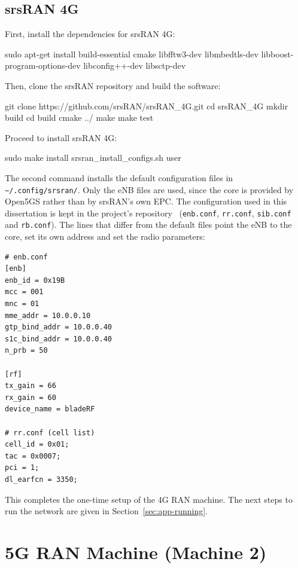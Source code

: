 \subsection{srsRAN 4G}
\label{sec:srsRAN_4G}
First, install the dependencies for srsRAN 4G:
\begin{code}
sudo apt-get install build-essential cmake libfftw3-dev libmbedtls-dev libboost-program-options-dev libconfig++-dev libsctp-dev
\end{code}
Then, clone the srsRAN repository and build the software:
\begin{code}
git clone https://github.com/srsRAN/srsRAN_4G.git
cd srsRAN_4G
mkdir build
cd build
cmake ../
make
make test
\end{code}
Proceed to install srsRAN 4G:
\begin{code}
sudo make install
srsran_install_configs.sh user
\end{code}

The second command installs the default configuration files in \texttt{\textasciitilde/.config/srsran/}. Only the \gls{eNB} files are used, since the core is provided by Open5GS rather than by srsRAN's own \gls{EPC}. The configuration used in this dissertation is kept in the project's repository~\cite{thesis_repo} (\texttt{enb.conf}, \texttt{rr.conf}, \texttt{sib.conf} and \texttt{rb.conf}). The lines that differ from the default files point the \gls{eNB} to the core, set its own address and set the radio parameters:
\begin{verbatim}
# enb.conf
[enb]
enb_id = 0x19B
mcc = 001
mnc = 01
mme_addr = 10.0.0.10
gtp_bind_addr = 10.0.0.40
s1c_bind_addr = 10.0.0.40
n_prb = 50

[rf]
tx_gain = 66
rx_gain = 60
device_name = bladeRF

# rr.conf (cell list)
cell_id = 0x01;
tac = 0x0007;
pci = 1;
dl_earfcn = 3350;
\end{verbatim}

This completes the one-time setup of the 4G \gls{RAN} machine. The next steps to run the network are given in Section~\ref{sec:app-running}.


\section{5G RAN Machine (Machine 2)}
\label{sec:app-5g-ran}

